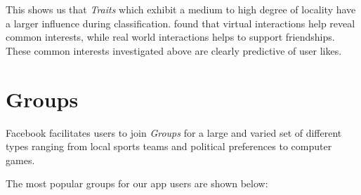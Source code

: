 This shows us that \emph{Traits} which exhibit a medium to high degree of locality have a larger influence during classification. 
\cite{brandtzag2011facebook} found that virtual interactions help reveal common interests, while real world interactions helps 
to support friendships. These common interests investigated above are clearly predictive of user likes.

\clearpage

\section{Groups}
\label{sec:groups}

Facebook facilitates users to join \emph{Groups} for a large and varied set of different types ranging from 
local sports teams and political preferences to computer games.

\clearpage

The most popular groups for our app users are shown below:


